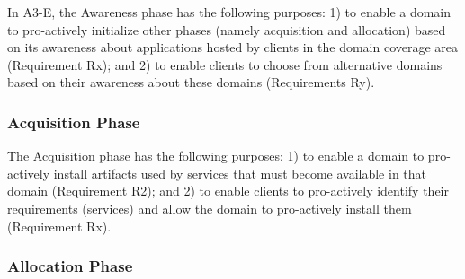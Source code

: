 In A3-E, the Awareness phase has the following purposes: 1) to enable a domain to pro-actively initialize other phases (namely acquisition and allocation) based on its awareness about  applications hosted by clients in the domain coverage area (Requirement Rx); and 2) to enable clients to choose from alternative domains based on their awareness about these domains (Requirements Ry).


\subsubsection*{Acquisition Phase}\label{sec:A3-E-acquisition}

The Acquisition phase has the following purposes: 1) to enable a domain to pro-actively install artifacts used by services that must become available in that domain (Requirement R2); and 2) to enable clients to pro-actively identify their requirements (services) and allow the domain to pro-actively install them (Requirement Rx).




\subsubsection*{Allocation Phase}\label{sec:A3-E-allocation}


